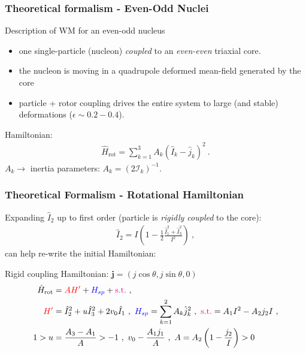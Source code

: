 \documentclass{beamer}
\begin{document}
\begin{frame}
  \frametitle{Theoretical formalism - Even-Odd Nuclei}
  \begin{exampleblock}{Description of WM for an even-odd nucleus}
    \begin{itemize}
      \item one single-particle (nucleon) \emph{coupled} to an \emph{even-even} triaxial core.
      \item the nucleon is moving in a quadrupole deformed mean-field generated by the core
      \item particle + rotor coupling drives the entire system to large (and stable) deformations ($\epsilon\sim0.2-0.4$).
    \end{itemize}
  \end{exampleblock}
Hamiltonian:
\begin{align}
  \hat{H}_\text{rot}=\sum_{k=1}^3A_k\left(\hat{I}_k-\hat{j}_k\right)^2\ .
\end{align}
$A_k\rightarrow$ inertia parameters: $A_k=(2\mathcal{I}_k)^{-1}$.
\end{frame}

\begin{frame}
  \frametitle{Theoretical Formalism - Rotational Hamiltonian}

  Expanding $\hat{I}_2$ up to first order (particle is \emph{rigidly coupled} to the core):
  \begin{align}
    \hat{I}_2=I\left(1-\frac{1}{2}\frac{\hat{I}_1^2+\hat{I}_3^2}{I^2}\right)\ ,
  \end{align}
can help re-write the initial Hamiltonian: %
\begin{exampleblock}{Rigid coupling Hamiltonian: $\mathbf{j}=(j\cos\theta,j\sin\theta,0)$}
  \begin{align}
    \hat{H}_\text{rot}&={\color{red}AH'}+{\color{blue}H_{sp}}+{\color{magenta}\text{s.t.}}\ ,\\
    {\color{red}H'}&=\hat{I}_2^2+u\hat{I}_3^2+2v_0\hat{I}_1\ ,\ {\color{blue}H_{sp}}=\sum_{k=1}^2A_k\hat{j}_k^2\ ,\ {\color{magenta}\text{s.t.}}=A_1I^2-A_2j_2I\ ,\\
    1>u&=\frac{A_3-A_1}{A}>-1\ ,\ v_0-\frac{A_1j_1}{A}\ ,\ A=A_2\left(1-\frac{j_2}{I}\right)>0
  \end{align}
\end{exampleblock}
\end{frame}
\end{document}
